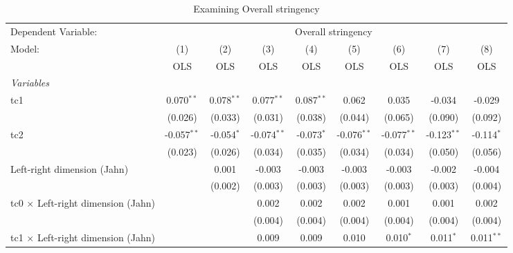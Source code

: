 
\begin{table}[htbp]
   \caption{Examining Overall stringency}
   \centering
   \begin{tabular}{lcccccccc}
      \toprule
      Dependent Variable: & \multicolumn{8}{c}{Overall stringency}\\
      Model:                                    & (1)           & (2)          & (3)           & (4)          & (5)           & (6)           & (7)           & (8)\\  
                                                &  OLS          & OLS          & OLS           & OLS          & OLS           & OLS           & OLS           & OLS\\  
      \midrule
      \emph{Variables}\\
      tc1                                       & 0.070$^{**}$  & 0.078$^{**}$ & 0.077$^{**}$  & 0.087$^{**}$ & 0.062         & 0.035         & -0.034        & -0.029\\   
                                                & (0.026)       & (0.033)      & (0.031)       & (0.038)      & (0.044)       & (0.065)       & (0.090)       & (0.092)\\   
      tc2                                       & -0.057$^{**}$ & -0.054$^{*}$ & -0.074$^{**}$ & -0.073$^{*}$ & -0.076$^{**}$ & -0.077$^{**}$ & -0.123$^{**}$ & -0.114$^{*}$\\   
                                                & (0.023)       & (0.026)      & (0.034)       & (0.035)      & (0.034)       & (0.034)       & (0.050)       & (0.056)\\   
      Left-right dimension (Jahn)               &               & 0.001        & -0.003        & -0.003       & -0.003        & -0.003        & -0.002        & -0.004\\   
                                                &               & (0.002)      & (0.003)       & (0.003)      & (0.003)       & (0.003)       & (0.003)       & (0.004)\\   
      tc0 $\times$ Left-right dimension (Jahn)  &               &              & 0.002         & 0.002        & 0.002         & 0.001         & 0.001         & 0.002\\   
                                                &               &              & (0.004)       & (0.004)      & (0.004)       & (0.004)       & (0.004)       & (0.004)\\   
      tc1 $\times$ Left-right dimension (Jahn)  &               &              & 0.009         & 0.009        & 0.010         & 0.010$^{*}$   & 0.011$^{*}$   & 0.011$^{**}$\\   

\end{tabular}
\end{table}
